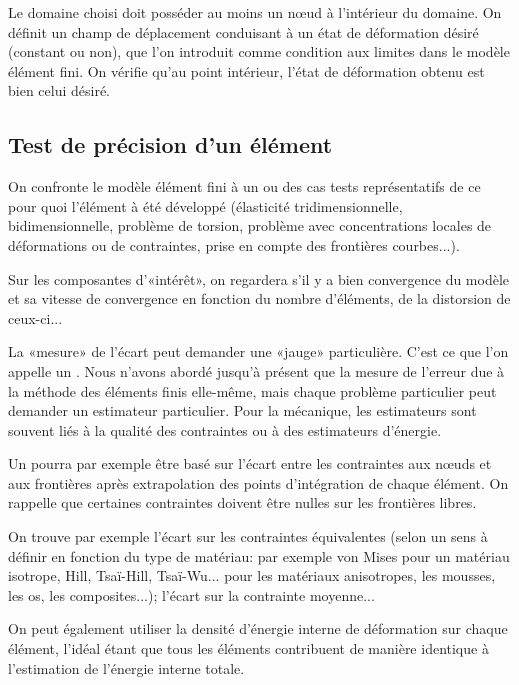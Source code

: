Le domaine choisi doit posséder au moins un nœud à l'intérieur du domaine. On définit un champ de déplacement conduisant à un état de déformation désiré (constant ou non), que l'on introduit comme condition aux limites dans le modèle élément fini. On vérifie qu'au point intérieur, l'état de déformation obtenu est bien celui désiré.

\medskip
\subsection{Test de précision d'un élément}

On confronte le modèle élément fini à un ou des cas tests représentatifs de ce pour quoi l'élément à été développé (élasticité tridimensionnelle, bidimensionnelle, problème de torsion, problème avec concentrations locales de déformations ou de contraintes, prise en compte des frontières courbes...).

Sur les composantes d'«intérêt», on regardera s'il y a bien convergence du modèle et sa vitesse de convergence en fonction du nombre d'éléments, de la distorsion de ceux-ci...

\medskip
La «mesure» de l'écart peut demander une «jauge» particulière. C'est ce que l'on appelle un . Nous n'avons abordé jusqu'à présent que la mesure de l'erreur due à la méthode des éléments finis elle-même, mais chaque problème particulier peut demander un estimateur particulier.
Pour la mécanique, les estimateurs sont souvent liés à la qualité des contraintes ou à des estimateurs d'énergie.

\medskip
Un  pourra par exemple être basé sur l'écart entre les contraintes aux nœuds et aux frontières après extrapolation des points d'intégration de chaque élément. On rappelle que certaines contraintes doivent être nulles sur les frontières libres.

On trouve par exemple l'écart sur les contraintes équivalentes (selon un sens à définir en fonction du type de matériau: par exemple von Mises pour un matériau isotrope, Hill, Tsaï-Hill, Tsaï-Wu... pour les matériaux anisotropes, les mousses, les os, les composites...); l'écart sur la contrainte moyenne...

On peut également utiliser la densité d'énergie interne de déformation sur chaque élément, l'idéal étant que tous les éléments contribuent de manière identique à l'estimation de l'énergie interne totale.

